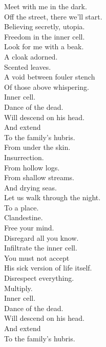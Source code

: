 Meet with me in the dark. \\
Off the street, there we'll start. \\
Believing secretly, utopia. \\
Freedom in the inner cell. \\

Look for me with a beak. \\
A cloak adorned. \\
Scented leaves. \\
A void between fouler stench \\
Of those above whispering. \\
Inner cell. \\

Dance of the dead. \\
Will descend on his head. \\
And extend \\
To the family's hubris. \\

From under the skin. \\
Insurrection. \\
From hollow logs. \\
From shallow streams. \\
And drying seas. \\

Let us walk through the night. \\
To a place. \\
Clandestine. \\
Free your mind. \\
Disregard all you know. \\
Infiltrate the inner cell. \\

You must not accept \\
His sick version of life itself. \\
Disrespect everything. \\
Multiply. \\
Inner cell. \\

Dance of the dead. \\
Will descend on his head. \\
And extend \\
To the family's hubris. \\

